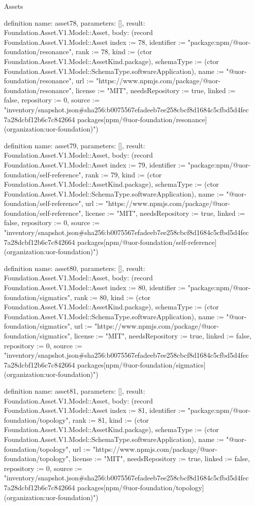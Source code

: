 \begin{lexlean}{Assets}
\begin{semanticmodule}
definition{
  name: asset78,
  parameters: [],
  result: Foundation.Asset.V1.Model::Asset,
  body: (record Foundation.Asset.V1.Model::Asset {index := 78, identifier := "package:npm/@uor-foundation/resonance", rank := 78, kind := (ctor Foundation.Asset.V1.Model::AssetKind.package), schemaType := (ctor Foundation.Asset.V1.Model::SchemaType.softwareApplication), name := "@uor-foundation/resonance", url := "https://www.npmjs.com/package/@uor-foundation/resonance", license := "MIT", needsRepository := true, linked := false, repository := 0, source := "inventory/snapshot.json#sha256:b0075567efadeeb7ee258cbcf8d1684c5cfbd5d4fec7a28dcbf12b6c7c842664 packages[npm/@uor-foundation/resonance] (organization:uor-foundation)"})
}

definition{
  name: asset79,
  parameters: [],
  result: Foundation.Asset.V1.Model::Asset,
  body: (record Foundation.Asset.V1.Model::Asset {index := 79, identifier := "package:npm/@uor-foundation/self-reference", rank := 79, kind := (ctor Foundation.Asset.V1.Model::AssetKind.package), schemaType := (ctor Foundation.Asset.V1.Model::SchemaType.softwareApplication), name := "@uor-foundation/self-reference", url := "https://www.npmjs.com/package/@uor-foundation/self-reference", license := "MIT", needsRepository := true, linked := false, repository := 0, source := "inventory/snapshot.json#sha256:b0075567efadeeb7ee258cbcf8d1684c5cfbd5d4fec7a28dcbf12b6c7c842664 packages[npm/@uor-foundation/self-reference] (organization:uor-foundation)"})
}

definition{
  name: asset80,
  parameters: [],
  result: Foundation.Asset.V1.Model::Asset,
  body: (record Foundation.Asset.V1.Model::Asset {index := 80, identifier := "package:npm/@uor-foundation/sigmatics", rank := 80, kind := (ctor Foundation.Asset.V1.Model::AssetKind.package), schemaType := (ctor Foundation.Asset.V1.Model::SchemaType.softwareApplication), name := "@uor-foundation/sigmatics", url := "https://www.npmjs.com/package/@uor-foundation/sigmatics", license := "MIT", needsRepository := true, linked := false, repository := 0, source := "inventory/snapshot.json#sha256:b0075567efadeeb7ee258cbcf8d1684c5cfbd5d4fec7a28dcbf12b6c7c842664 packages[npm/@uor-foundation/sigmatics] (organization:uor-foundation)"})
}

definition{
  name: asset81,
  parameters: [],
  result: Foundation.Asset.V1.Model::Asset,
  body: (record Foundation.Asset.V1.Model::Asset {index := 81, identifier := "package:npm/@uor-foundation/topology", rank := 81, kind := (ctor Foundation.Asset.V1.Model::AssetKind.package), schemaType := (ctor Foundation.Asset.V1.Model::SchemaType.softwareApplication), name := "@uor-foundation/topology", url := "https://www.npmjs.com/package/@uor-foundation/topology", license := "MIT", needsRepository := true, linked := false, repository := 0, source := "inventory/snapshot.json#sha256:b0075567efadeeb7ee258cbcf8d1684c5cfbd5d4fec7a28dcbf12b6c7c842664 packages[npm/@uor-foundation/topology] (organization:uor-foundation)"})
}


\end{semanticmodule}
\end{lexlean}
